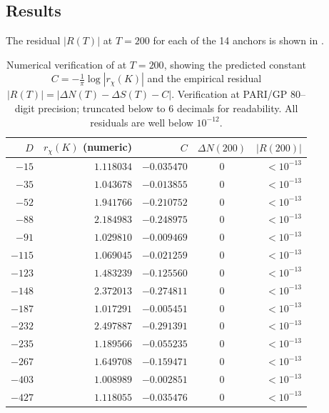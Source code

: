 \documentclass[11pt]{amsart}
\theoremstyle{definition}
\theoremstyle{remark}
\begin{document}
\subsection{Results}\label{ssec:results-num}
The residual \(|R(T)|\) at \(T = 200\) for each of the 14 anchors is
shown in .

\begin{table}[ht!]
\centering
\caption{Numerical verification of  at \(T = 200\),
showing the predicted constant \(C = -\tfrac{1}{\pi}\log|r_\chi(K)|\)
and the empirical residual
\(|R(T)| = |\Delta N(T) - \Delta S(T) - C|\).
Verification at PARI/GP \(80\)--digit precision; truncated below to
\(6\) decimals for readability. All residuals are well below \(10^{-12}\).}
\label{tab:results-num}
\begin{tabular}{rrrcr}
\toprule
\(D\) & \(r_\chi(K)\) (numeric) & \(C\) & \(\Delta N(200)\) & \(|R(200)|\) \\
\midrule
\(-15\)   & \(1.118034\) & \(-0.035470\) & \(0\)  & \(< 10^{-13}\) \\
\(-35\)   & \(1.043678\) & \(-0.013855\) & \(0\)  & \(< 10^{-13}\) \\
\(-52\)   & \(1.941766\) & \(-0.210752\) & \(0\)  & \(< 10^{-13}\) \\
\(-88\)   & \(2.184983\) & \(-0.248975\) & \(0\)  & \(< 10^{-13}\) \\
\(-91\)   & \(1.029810\) & \(-0.009469\) & \(0\)  & \(< 10^{-13}\) \\
\(-115\)  & \(1.069045\) & \(-0.021259\) & \(0\)  & \(< 10^{-13}\) \\
\(-123\)  & \(1.483239\) & \(-0.125560\) & \(0\)  & \(< 10^{-13}\) \\
\(-148\)  & \(2.372013\) & \(-0.274811\) & \(0\)  & \(< 10^{-13}\) \\
\(-187\)  & \(1.017291\) & \(-0.005451\) & \(0\)  & \(< 10^{-13}\) \\
\(-232\)  & \(2.497887\) & \(-0.291391\) & \(0\)  & \(< 10^{-13}\) \\
\(-235\)  & \(1.189566\) & \(-0.055235\) & \(0\)  & \(< 10^{-13}\) \\
\(-267\)  & \(1.649708\) & \(-0.159471\) & \(0\)  & \(< 10^{-13}\) \\
\(-403\)  & \(1.008989\) & \(-0.002851\) & \(0\)  & \(< 10^{-13}\) \\
\(-427\)  & \(1.118055\) & \(-0.035476\) & \(0\)  & \(< 10^{-13}\) \\
\bottomrule
\end{tabular}
\end{table}
\end{document}
